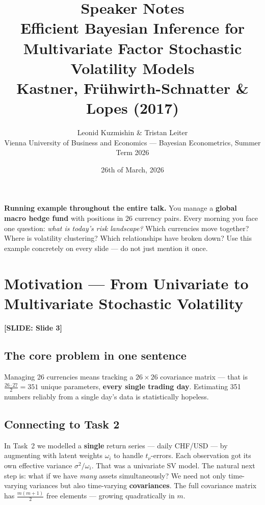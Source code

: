 \documentclass[11pt, a4paper]{article}\usepackage[]{graphicx}\usepackage[]{xcolor}
\title{
  {\large\color{DarkGrey} Speaker Notes}\\[0.4em]
  {\LARGE\bfseries\color{MainBlue}
    Efficient Bayesian Inference for\\
    Multivariate Factor Stochastic Volatility Models}\\[0.4em]
  {\normalsize Kastner, Fr\"uhwirth-Schnatter \& Lopes (2017)}
}
\author{Leonid Kuzmishin \quad \& \quad Tristan Leiter\\
  \small Vienna University of Business and Economics ---
  Bayesian Econometrics, Summer Term 2026}
\date{26th of March, 2026}
\newcommand{\slidetag}[1]{%
  \noindent\textcolor{MainBlue}{\footnotesize\textbf{[SLIDE: #1]}}%
  \vspace{0.2em}\par
}
\newcommand{\stress}[1]{\textbf{#1}}
\begin{document}

\maketitle
\thispagestyle{empty}

\begin{remarkbox}
  \textbf{Running example throughout the entire talk.}
  You manage a \textbf{global macro hedge fund} with positions in 26 currency
  pairs.  Every morning you face one question: \textit{what is today's risk
  landscape?}  Which currencies move together?  Where is volatility clustering?
  Which relationships have broken down?  Use this example concretely on every
  slide --- do not just mention it once.
\end{remarkbox}

\vspace{1em}
\tableofcontents
\newpage

\section{Motivation --- From Univariate to Multivariate Stochastic Volatility}

\slidetag{Slide 3}

\subsection{The core problem in one sentence}

Managing 26 currencies means tracking a $26 \times 26$ covariance matrix ---
that is $\frac{26 \cdot 27}{2} = 351$ unique parameters, \stress{every single
trading day}.  Estimating 351 numbers reliably from a single day's data is
statistically hopeless.

\subsection{Connecting to Task 2}

In Task~2 we modelled a \stress{single} return series --- daily CHF/USD --- by
augmenting with latent weights $\omega_i$ to handle $t_\nu$-errors.  Each
observation got its own effective variance $\sigma^2/\omega_i$.  That was a
univariate SV model.  The natural next step is: what if we have \textit{many}
assets simultaneously?  We need not only time-varying variances but also
time-varying \stress{covariances}.  The full covariance matrix has
$\frac{m(m+1)}{2}$ free elements --- growing quadratically in $m$.
\end{document}
